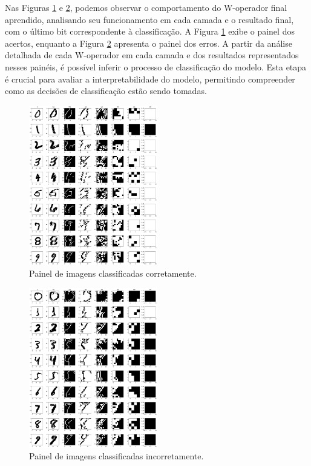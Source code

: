 Nas Figuras \ref{fig:painel_acerto} e \ref{fig:painel_erro}, podemos observar o comportamento do W-operador final aprendido, analisando seu funcionamento em cada camada e o resultado final, com o último bit correspondente à classificação. A Figura \ref{fig:painel_acerto} exibe o painel dos acertos, enquanto a Figura \ref{fig:painel_erro} apresenta o painel dos erros. A partir da análise detalhada de cada W-operador em cada camada e dos resultados representados nesses painéis, é possível inferir o processo de classificação do modelo. Esta etapa é crucial para avaliar a interpretabilidade do modelo, permitindo compreender como as decisões de classificação estão sendo tomadas.

\begin{figure}[H]
    \centering
    \includegraphics[width=0.5\textwidth]{figuras/painel_acerto.png}
    \caption{Painel de imagens classificadas corretamente.}
    \label{fig:painel_acerto}
\end{figure}

\begin{figure}[H]
    \centering
    \includegraphics[width=0.5\textwidth]{figuras/painel_erro.png}
    \caption{Painel de imagens classificadas incorretamente.}
    \label{fig:painel_erro}
\end{figure}

